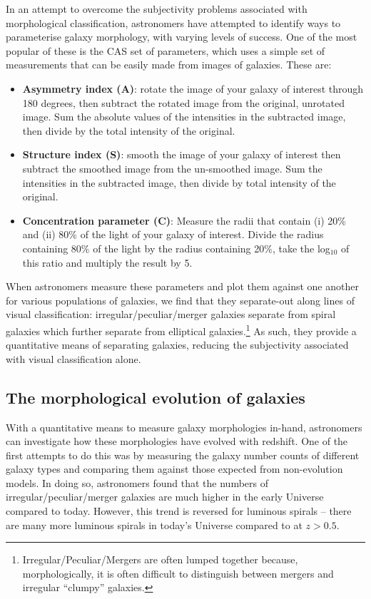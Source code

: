 \documentclass[11pt]{article}
\begin{document}
In an attempt to overcome the subjectivity problems associated with
morphological classification, astronomers have attempted to identify
ways to parameterise galaxy morphology, with varying levels of
success. One of the most popular of these is the CAS set of
parameters, which uses a simple set of measurements that can be easily
made from images of galaxies. These are:
\begin{itemize}
\item {\bf Asymmetry index (A)}: rotate the image of your galaxy of
  interest through 180 degrees, then subtract the rotated image from
  the original, unrotated image. Sum the absolute values of the
  intensities in the subtracted image, then divide by the total
  intensity of the original.
\item {\bf Structure index (S)}: smooth the image of your galaxy of
  interest then subtract the smoothed image from the un-smoothed
  image. Sum the intensities in the subtracted image, then divide by total
  intensity of the original.
\item {\bf Concentration parameter (C)}: Measure the radii that
  contain (i) 20\% and (ii) 80\% of the light of your galaxy of
  interest. Divide the radius containing 80\% of the light by the
  radius containing 20\%, take the log$_{10}$ of this ratio and
  multiply the result by 5.
\end{itemize}

When astronomers measure these parameters and plot them against one
another for various populations of galaxies, we find that they
separate-out along lines of visual classification:
irregular/peculiar/merger galaxies separate from spiral galaxies which
further separate from elliptical
galaxies.\footnote{Irregular/Peculiar/Mergers are often lumped together
  because, morphologically, it is often difficult to distinguish
  between mergers and irregular ``clumpy'' galaxies.} As such, they
provide a quantitative means of separating galaxies, reducing the
subjectivity associated with visual classification alone.

\subsection{The morphological evolution of galaxies}
With a quantitative means to measure galaxy morphologies in-hand,
astronomers can investigate how these morphologies have evolved with
redshift. One of the first attempts to do this was by measuring the
galaxy number counts of different galaxy types and comparing them
against those expected from non-evolution models. In doing so,
astronomers found that the numbers of irregular/peculiar/merger
galaxies are much higher in the early Universe compared to
today. However, this trend is reversed for luminous spirals -- there
are many more luminous spirals in today's Universe compared to at
$z>0.5$.
\end{document}
